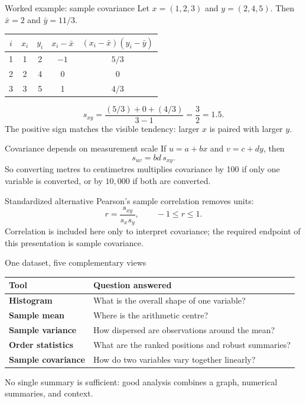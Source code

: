\documentclass[aspectratio=169,11pt]{beamer}
\begin{document}
\begin{frame}{Worked example: sample covariance}
Let $x=(1,2,3)$ and $y=(2,4,5)$. Then $\bar{x}=2$ and $\bar{y}=11/3$.
\begin{center}
\begin{tabular}{ccccc}
\toprule
$i$ & $x_i$ & $y_i$ & $x_i-\bar{x}$ & $(x_i-\bar{x})(y_i-\bar{y})$\\
\midrule
1 & 1 & 2 & $-1$ & $5/3$\\
2 & 2 & 4 & 0 & 0\\
3 & 3 & 5 & 1 & $4/3$\\
\bottomrule
\end{tabular}
\end{center}
\[
s_{xy}=\frac{(5/3)+0+(4/3)}{3-1}=\frac{3}{2}=1.5.
\]
The positive sign matches the visible tendency: larger $x$ is paired with larger $y$.
\end{frame}

\begin{frame}{Covariance depends on measurement scale}
If $u=a+bx$ and $v=c+dy$, then
\[
s_{uv}=bd\,s_{xy}.
\]
So converting metres to centimetres multiplies covariance by 100 if only one variable is converted, or by $10{,}000$ if both are converted.

\begin{block}{Standardized alternative}
Pearson's sample correlation removes units:
\[
r=\frac{s_{xy}}{s_xs_y},\qquad -1\le r\le1.
\]
Correlation is included here only to interpret covariance; the required endpoint of this presentation is sample covariance.
\end{block}
\end{frame}

\begin{frame}{One dataset, five complementary views}
\begin{center}
\begin{tabular}{>{\bfseries}l p{8.3cm}}
\toprule
Tool & Question answered\\
\midrule
Histogram & What is the overall shape of one variable?\\
Sample mean & Where is the arithmetic centre?\\
Sample variance & How dispersed are observations around the mean?\\
Order statistics & What are the ranked positions and robust summaries?\\
Sample covariance & How do two variables vary together linearly?\\
\bottomrule
\end{tabular}
\end{center}
No single summary is sufficient: good analysis combines a graph, numerical summaries, and context.
\end{frame}
\end{document}
